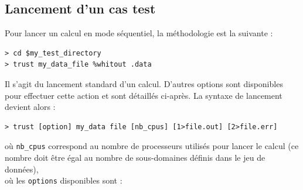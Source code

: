 \subsection{Lancement d'un cas test}
Pour lancer un calcul en mode séquentiel, la méthodologie est la suivante :
\begin{lstlisting}
> cd $my_test_directory
> trust my_data_file %whitout .data
\end{lstlisting}
Il s'agit du lancement standard d'un calcul. D'autres options sont disponibles pour effectuer cette action et sont détaillés ci-après. La syntaxe de lancement devient alors :
\begin{lstlisting}
> trust [option] my_data file [nb_cpus] [1>file.out] [2>file.err]
\end{lstlisting}
où \texttt{nb\_cpus} correspond au nombre de processeurs utilisés pour lancer le calcul (ce nombre doit être égal au nombre de sous-domaines définis dans le jeu de données),\\
où les \texttt{options} disponibles sont :
